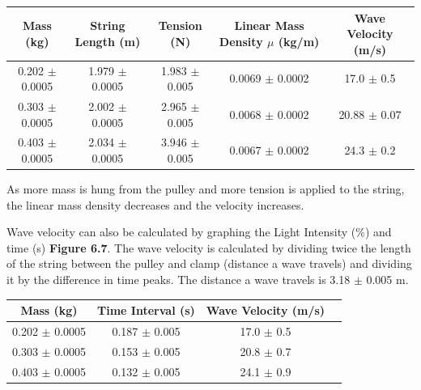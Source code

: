 \documentclass[11pt]{report}
\begin{document}
\begin{center}
    \begin{tabular}{| c | c | c | c | c |}
        \hline
        Mass (kg) & String Length (m) & Tension (N) & Linear Mass Density
        $\mu$ (kg/m) & Wave Velocity (m/s) \\
        \hline
        0.202 $\pm$ 0.0005 & 1.979 $\pm$ 0.0005 & 1.983 $\pm$ 0.005 & 0.0069
        $\pm$ 0.0002 & 17.0 $\pm$ 0.5 \\ 
        \hline
        0.303 $\pm$ 0.0005 & 2.002 $\pm$ 0.0005 & 2.965 $\pm$ 0.005 & 0.0068
        $\pm$ 0.0002 & 20.88 $\pm$ 0.07 \\
        \hline
        0.403 $\pm$ 0.0005 & 2.034 $\pm$ 0.0005 & 3.946 $\pm$ 0.005 & 0.0067
        $\pm$ 0.0002 & 24.3 $\pm$ 0.2 \\
        \hline
    \end{tabular}
\end{center}

\setlength{\parindent}{5ex}
As more mass is hung from the pulley and more tension is applied to the string,
the linear mass density decreases and the velocity increases. 

Wave velocity can also be calculated by graphing the Light Intensity ($\%$) and
time (s) \textbf{Figure 6.7}.  The wave velocity is calculated by dividing twice the
length of the string between the pulley and clamp (distance a wave travels) and 
dividing it by the difference in time peaks. The distance a wave travels is 3.18
$\pm$ 0.005 m.  


\begin{center}
    \begin{tabular}{| c | c | c | c |}
        \hline
        Mass (kg) & Time Interval (s)& Wave Velocity (m/s) \\
        \hline
        0.202 $\pm$ 0.0005 & 0.187 $\pm$ 0.005 & 17.0 $\pm$ 0.5\\ 
        \hline
        0.303 $\pm$ 0.0005 & 0.153 $\pm$ 0.005 & 20.8 $\pm$ 0.7\\
        \hline
        0.403 $\pm$ 0.0005 & 0.132 $\pm$ 0.005 & 24.1 $\pm$ 0.9 \\
        \hline
    \end{tabular}
\end{center}
\end{document}

